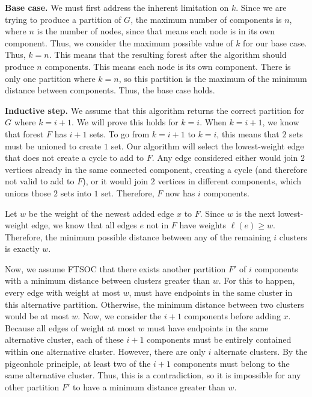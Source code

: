 \documentclass[11pt]{article}
\begin{document}
\textbf{Base case.} 
We must first address the inherent limitation on $k$. Since we are trying to produce a partition of $G$, the maximum number of components is $n$, 
where $n$ is the number of nodes, since that means each node is in its own component. Thus, we consider the maximum possible value of $k$ for our base case. 
Thus, $k = n$. This means that the resulting forest after the algorithm should produce $n$ components. This means each node is its own component. 
There is only one partition where $k = n$, so this partition is the maximum of the minimum distance between components. Thus, the base case holds.

\textbf{Inductive step.} 
We assume that this algorithm returns the correct partition for $G$ where $k = i + 1$. We will prove this holds for $k = i$. 
When $k = i + 1$, we know that forest $F$ has $i + 1$ sets. To go from $k = i + 1$ to $k = i$, this means that $2$ sets 
must be unioned to create $1$ set. Our algorithm will select the lowest-weight edge that does not create a cycle to add to $F$. 
Any edge considered either would join $2$ vertices already in the same connected component, creating a cycle (and therefore not valid to add to $F$), 
or it would join $2$ vertices in different components, which unions those $2$ sets into $1$ set. Therefore, $F$ now has $i$ components. 

Let $w$ be the weight of the newest added edge $x$ to $F$. Since $w$ is the next lowest-weight edge, we know that all edges $e$ not in $F$ have weights 
$\ell(e) \geq w$. Therefore, the minimum possible distance between any of the remaining $i$ clusters is exactly $w$. 

Now, we assume FTSOC that there exists another partition $F'$ of $i$ components with a minimum distance between clusters greater than $w$. 
For this to happen, every edge with weight at most $w$, must have endpoints in the same cluster in this alternative partition. 
Otherwise, the minimum distance between two clusters would be at most $w$. Now, we consider the $i + 1$ components before adding $x$. 
Because all edges of weight at most $w$ must have endpoints in the same alternative cluster, each of these $i + 1$ components must be 
entirely contained within one alternative cluster. However, there are only $i$ alternate clusters.
By the pigeonhole principle, at least two of the $i + 1$ components must belong to the same alternative cluster. 
Thus, this is a contradiction, so it is impossible for any other partition $F'$ to have a minimum distance greater than $w$. 
\end{document}
